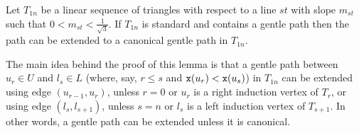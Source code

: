 

\begingroup
\def\thetheorem{\ref{le:boundedGentelSections}}
\begin{lemma} 
Let $T_{1n}$ be a linear sequence of triangles with respect to a line $st$ with
slope $m_{st}$ such that $0 < m_{st} < \frac{1}{\sqrt{3}}$. If $T_{1n}$ is
standard and contains a gentle path then the path can be extended
to a canonical gentle path in $T_{1n}$.
\end{lemma}
\addtocounter{theorem}{-1}
\endgroup

The main idea behind the proof of this lemma is that a gentle path between
$u_r \in U$ and $l_s \in L$ (where, say, $r \leq s$ and 
${\tt x}(u_r) < {\tt x}(u_s)$) in $T_{1n}$ can 
be extended using edge $(u_{r-1},u_r)$, unless $r=0$ or $u_r$ is a right
induction vertex of $T_{r}$, or using edge $(l_{s},l_{s+1})$, unless $s=n$ or
$l_s$ is a left induction vertex of $T_{s+1}$. In other words, a gentle path
can be extended unless it is canonical.

